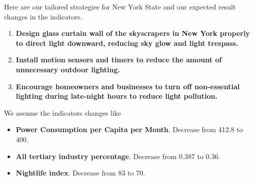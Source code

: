 Here are our tailored strategies for New York State and our expected result changes in the indicators.

\begin{enumerate}
    \item \textbf{Design glass curtain wall of the skyscrapers in New York properly to direct light downward, reducing sky glow and light trespass.} 

    \item \textbf{Install motion sensors and timers to reduce the amount of unnecessary outdoor lighting.}
    
    \item \textbf{Encourage homeowners and businesses to turn off non-essential lighting during late-night hours to reduce light pollution.}

\end{enumerate}

We assume the indicators changes like
\begin{itemize}
    \item \textbf{Power Consumption per Capita per Month}. Decrease from 412.8 to 400.
    \item \textbf{All tertiary industry percentage}. Decrease from 0.387 to 0.36.
    \item \textbf{Nightlife index}. Decrease from 83 to 70.
\end{itemize}